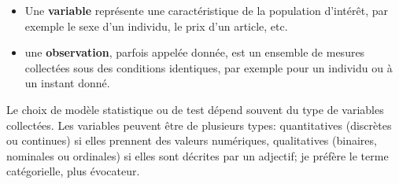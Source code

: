 \documentclass[
  11pt,
  letterpaper,
]{book}
\providecommand{\tightlist}{%
  \setlength{\itemsep}{0pt}\setlength{\parskip}{0pt}}\usepackage{longtable,booktabs,array}
\theoremstyle{definition}
\theoremstyle{remark}
\begin{document}
\begin{itemize}
\tightlist
\item
  Une \textbf{variable} représente une caractéristique de la population
  d'intérêt, par exemple le sexe d'un individu, le prix d'un article,
  etc.
\item
  une \textbf{observation}, parfois appelée donnée, est un ensemble de
  mesures collectées sous des conditions identiques, par exemple pour un
  individu ou à un instant donné.
\end{itemize}

Le choix de modèle statistique ou de test dépend souvent du type de
variables collectées. Les variables peuvent être de plusieurs types:
quantitatives (discrètes ou continues) si elles prennent des valeurs
numériques, qualitatives (binaires, nominales ou ordinales) si elles
sont décrites par un adjectif; je préfère le terme catégorielle, plus
évocateur.
\end{document}
